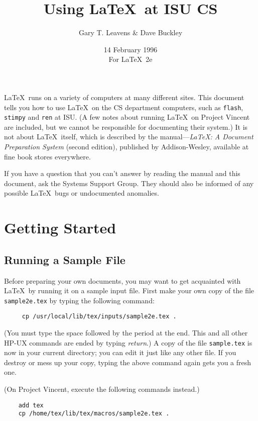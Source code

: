 \documentclass{article}
\title{Using \LaTeX\ at ISU CS}
\author{Gary T. Leavens \& Dave Buckley}
\date{14 February 1996\\              %
For \LaTeX\ 2e}
\newcommand{\contact}{the Systems Support Group}
\begin{document}
\maketitle

\tableofcontents

\newpage

\LaTeX\ runs on a variety of computers at many different sites.  This
document tells you how to use \LaTeX\ on the CS department
computers, such as {\tt flash}, {\tt stimpy} and {\tt ren} at ISU.
(A few notes about running \LaTeX\ on Project Vincent are included,
but we cannot be responsible for documenting their system.)
It is not about \LaTeX\ itself, which is described by
the manual---{\em \LaTeX: A Document Preparation System\/} (second edition),
published by Addison-Wesley, available at fine book stores everywhere.

If you have a question that you can't answer by reading the manual and
this document, ask \contact.  They should also be informed of any
possible \LaTeX\ bugs or undocumented anomalies.


\section{Getting Started}

\subsection{Running a Sample File} \label{sec:sample}

Before preparing your own documents, you may want to get acquainted
with \LaTeX\ by running it on a sample input file.  First make your own
copy of the file \mbox{\tt sample2e.tex} by typing the following
command:
\begin{verbatim}
     cp /usr/local/lib/tex/inputs/sample2e.tex .
\end{verbatim}
(You must type the space followed by the period at the end.  This
and all other HP-UX commands are ended by typing {\em return}.)
A copy of the file \mbox{\tt sample.tex} is now in your current
directory; you can edit it just like any other file.  If you destroy or
mess up your copy, typing the above command again gets you a fresh
one.

(On Project Vincent, execute the following commands instead.)
\begin{verbatim}
    add tex
    cp /home/tex/lib/tex/macros/sample2e.tex .
\end{verbatim}
\end{document}
